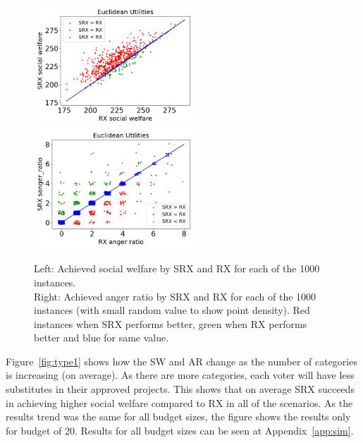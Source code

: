 \documentclass[runningheads]{llncs}
\begin{document}
\begin{figure}[t]
\begin{center}
\includegraphics[width=6cm]{simulation/unit_cat(25)_bud(20).jpeg}
\includegraphics[width=6cm]{simulation/ar_unit_cat(25)_bud(20).jpeg}
\caption{Left: Achieved social welfare by SRX and RX for each of the 1000 instances.\\
Right: Achieved anger ratio by SRX and RX for each of the 1000 instances (with small random value to show point density). Red instances when SRX performs better, green when RX performs better and blue for same value.
 }\label{fig:scatter}
\end{center}
\end{figure}



Figure~\ref{fig:type1} shows how the SW and AR change as the number of categories is increasing (on average). As there are more categories, each voter will have less substitutes in their approved projects. This shows that on average SRX succeeds in achieving higher social welfare compared to RX in all of the scenarios. As the results trend was the same for all budget sizes, the figure shows the results only for budget of 20. Results for all budget sizes can be seen at Appendix~\ref{app:sim}.
\end{document}
